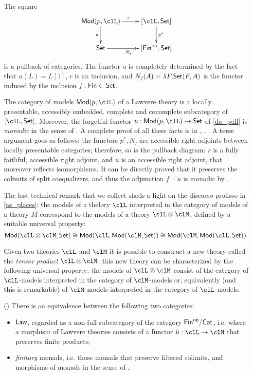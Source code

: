\begin{corollary}\label{da_pull}
	The square
	\[
		\xymatrix{
			\cate{Mod}(p,\clL) \ar[d]_u \ar[r]^r & [\clL,\Set]\ar[d]^{p^*} \\
			\Set \ar[r]_{N_j} & [\cate{Fin}^\op,\Set]
		}
	\]
	is a pullback of categories. The functor $u$ is completely determined by the fact that $u(L) = L[1]$, $r$ is an inclusion, and $N_j(A) = \lambda F.\mathsf{Set}(F,A)$ is the functor induced by the inclusion $j : \mathsf{Fin} \subset \mathsf{Set}$.
\end{corollary}
\begin{corollary}
	The category of models $\cate{Mod}(p,\clL)$ of a Lawvere theory is a locally presentable, accessibly embedded, complete and cocomplete subcategory of $[\clL,\Set]$. Moreover, the forgetful functor $u : \cate{Mod}(p,\clL) \to \Set$ of \autoref{da_pull} is \emph{monadic} in the sense of \cite[4.4.1]{Bor2}. A complete proof of all these facts is in \cite[3.4.5]{Bor2}, \cite[3.9.1]{Bor2}, \cite[5.2.2.a]{Bor2}. A terse argument goes as follows: the functors $p^*, N_j$ are accessible right adjoints between locally presentable categories; therefore, so is the pullback diagram: $r$ is a fully faithful, accessible right adjoint, and $u$ is an accessible right adjoint, that moreover reflects isomorphisms. It can be directly proved that it preserves the colimits of split coequalizers, and thus the adjunction $f \dashv u$ is monadic by \cite[4.4.4]{Bor2}.
\end{corollary}
The last technical remark that we collect sheds a light on the discorso prolisso in \autoref{as_places}: the models of a thelory $\clL$ interpreted in the category of models of a theory $M$ correspond to the models of a theory $\clL \otimes \clM$, defined by a suitable universal property:
\[
	\cate{Mod}(\clL\otimes \clM,\Set)  \cong
	\cate{Mod}(\clL, \cate{Mod}(\clM,\Set))  \cong
	\cate{Mod}(\clM, \cate{Mod}(\clL,\Set)).
\]
\begin{definition}
	Given two theories $\clL$ and $\clM$ it is possible to construct a new theory called the \emph{tensor product} $\clL \otimes \clM$; this new theory can be characterized by the following universal property: the models of $\clL \otimes \clM$ consist of the category of $\clL$-models interpreted in the category of $\clM$-models or, equivalently (and this is remarkable) of $\clM$-models interpreted in the category of $\clL$-models.
\end{definition}
\begin{theorem}
	(\cite[4.6.2]{Bor2}) There is an equivalence between the following two categories:
	\begin{itemize}
		\item $\mathsf{Law}$, regarded as a non-full subcategory of the category $\textsf{Fin}^{\text{op}}/\mathsf{Cat}$, i.e. where a morphism of Lawvere theories consists of a functor $h : \clL \to \clM$ that preserves finite products;
		\item \emph{finitary} monads, i.e. those monads that preserve filtered colimits, and morphisms of monads in the sense of \cite[4.5.8]{Bor2}.
	\end{itemize}
\end{theorem}
